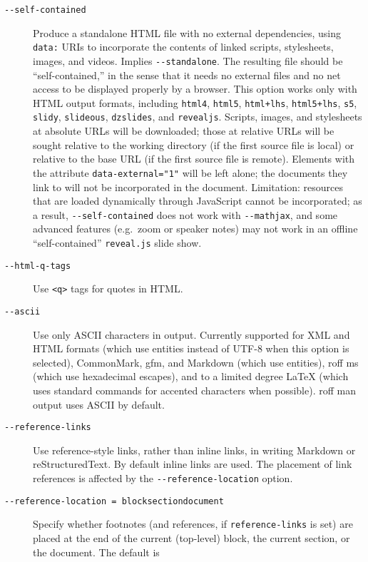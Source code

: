 \documentclass[
  12pt,
  a4paper,
]{article}
\begin{document}
\begin{description}
\item[\texttt{-\/-self-contained}]
Produce a standalone HTML file with no external dependencies, using \texttt{data:} URIs to
incorporate the contents of linked scripts, stylesheets, images, and videos. Implies
\texttt{-\/-standalone}. The resulting file should be ``self-contained,'' in the sense that it
needs no external files and no net access to be displayed properly by a browser. This option works
only with HTML output formats, including \texttt{html4}, \texttt{html5}, \texttt{html+lhs},
\texttt{html5+lhs}, \texttt{s5}, \texttt{slidy}, \texttt{slideous}, \texttt{dzslides}, and
\texttt{revealjs}. Scripts, images, and stylesheets at absolute URLs will be downloaded; those at
relative URLs will be sought relative to the working directory (if the first source file is local)
or relative to the base URL (if the first source file is remote). Elements with the attribute
\texttt{data-external="1"} will be left alone; the documents they link to will not be incorporated
in the document. Limitation: resources that are loaded dynamically through JavaScript cannot be
incorporated; as a result, \texttt{-\/-self-contained} does not work with \texttt{-\/-mathjax},
and some advanced features (e.g.~zoom or speaker notes) may not work in an offline
``self-contained'' \texttt{reveal.js} slide show.
\item[\texttt{-\/-html-q-tags}]
Use \texttt{\textless{}q\textgreater{}} tags for quotes in HTML.
\item[\texttt{-\/-ascii}]
Use only ASCII characters in output. Currently supported for XML and HTML formats (which use
entities instead of UTF-8 when this option is selected), CommonMark, gfm, and Markdown (which use
entities), roff ms (which use hexadecimal escapes), and to a limited degree LaTeX (which uses
standard commands for accented characters when possible). roff man output uses ASCII by default.
\item[\texttt{-\/-reference-links}]
Use reference-style links, rather than inline links, in writing Markdown or reStructuredText. By
default inline links are used. The placement of link references is affected by the
\texttt{-\/-reference-location} option.
\item[\texttt{-\/-reference-location\ =\ block}\textbar{}\texttt{section}\textbar{}\texttt{document}]
Specify whether footnotes (and references, if \texttt{reference-links} is set) are placed at the
end of the current (top-level) block, the current section, or the document. The default is

\end{description}
\end{document}
